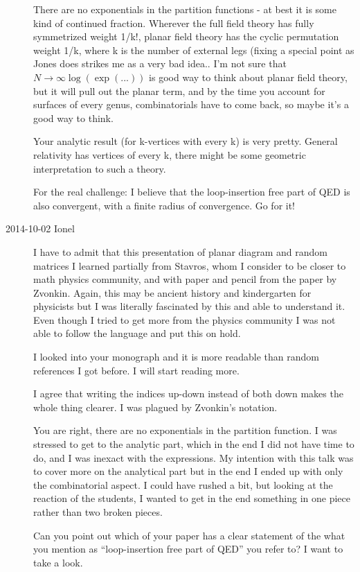 \begin{description}
There are no exponentials in the partition functions - at best it is some
kind of continued fraction. Wherever the full field theory has fully
symmetrized weight 1/k!, planar field theory has the cyclic permutation
weight 1/k, where k is the number of external legs (fixing a special
point as Jones does strikes me as a very bad idea.. I'm not sure that
$N\to\infty \log (\exp(...))$ is good way to think about planar field theory, but
it will pull out the planar term, and by the time you account for
surfaces of every genus, combinatorials have to come back, so maybe it's
a good way to think.

Your analytic result (for k-vertices with every k) is very pretty.
General relativity has vertices of every k, there might be some geometric
interpretation to such a theory.

For the real challenge: I believe that the loop-insertion free part of
QED is also convergent, with a finite radius of convergence. Go for it!

\item[2014-10-02 Ionel]
I have to admit that this presentation of planar diagram and random
matrices I learned partially from Stavros, whom I consider to be closer
to math physics community, and with paper and pencil from the paper by
Zvonkin.  Again, this may be ancient history and
kindergarten for physicists but I was literally fascinated by this and
able to understand it.  Even though I tried to get more from the physics
community I was not able to follow the language and put this on hold.

I looked into your monograph and it is more readable than random
references I got before. I will start reading more.

I agree that writing the indices up-down instead of both down makes the
whole thing clearer.  I was plagued by Zvonkin's notation.

You are right, there are no exponentials in the partition function. I was
stressed to get to the analytic part, which in the end I did not have
time to do, and I was inexact with the expressions.
My intention with this talk was to cover more on the analytical part but
in the end I ended up with only the combinatorial aspect.  I could have
rushed a bit, but looking at the reaction of the students, I wanted to
get in the end something in one piece rather than two broken pieces.

Can you point out which of your paper has a clear statement of the what
you mention as ``loop-insertion free part of QED'' you refer to?  I want to
take a look.


\end{description}
